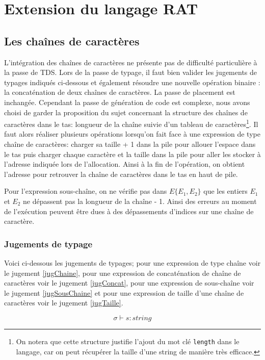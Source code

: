 \documentclass[11pt,a4paper]{article}
\begin{document}
\section{Extension du langage RAT}
\subsection{Les chaînes de caractères}

L'intégration des chaînes de caractères ne présente pas de difficulté particulière à la passe de TDS. Lors de la passe de typage, il faut bien valider les jugements de typages indiqués ci-dessous et également résoudre une nouvelle opération binaire : la concaténation de deux chaînes de caractères. La passe de placement est inchangée. Cependant la passe de génération de code est complexe, nous avons choisi de garder la proposition du sujet concernant la structure des chaînes de caractères dans le tas: longueur de la chaîne suivie d'un tableau de caractères\footnote{On notera que cette structure justifie l'ajout du mot clé \texttt{length} dans le langage, car on peut récupérer la taille d'une string de manière très efficace.}. Il faut alors réaliser plusieurs opérations lorsqu'on fait face à une expression de type chaîne de caractères: charger sa taille + 1 dans la pile pour allouer l'espace dans le tas puis charger chaque caractère et la taille dans la pile pour aller les stocker à l'adresse indiquée lors de l'allocation. Ainsi à la fin de l'opération, on obtient l'adresse pour retrouver la chaîne de caractères dans le tas en haut de pile.

Pour l'expression sous-chaîne, on ne vérifie pas dans $E\{E_1,E_2\}$ que les entiers $E_1$ et $E_2$ ne dépassent pas la longueur de la chaîne - 1. Ainsi des erreurs au moment de l'exécution peuvent être dues à des dépassements d'indices sur une chaîne de caractère.

\subsubsection*{Jugements de typage}

Voici ci-dessous les jugements de typages; pour une expression de type chaîne voir le jugement \ref{jugChaine}, pour une expression de concaténation de chaîne de caractères voir le jugement \ref{jugConcat}, pour une expression de sous-chaîne voir le jugement \ref{jugSousChaine} et pour une expression de taille d'une chaîne de caractères voir le jugement \ref{jugTaille}.

\begin{equation}
	\label{jugChaine}
	\sigma \vdash s : string 
\end{equation}
\end{document}
